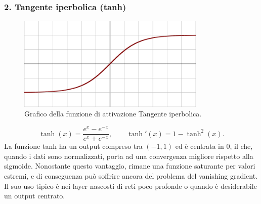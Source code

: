 \documentclass[a4paper,12pt]{report}
\begin{document}
	\subsubsection{2. Tangente iperbolica (tanh)}
	\begin{figure}[H]
		\centering
		\includegraphics[width=0.8\textwidth]{img/tanh.png}
		\caption{Grafico della funzione di attivazione Tangente iperbolica.}
	\end{figure}
	\[
	\tanh(x)=\frac{e^x-e^{-x}}{e^x+e^{-x}},\qquad
	\tanh'(x)=1-\tanh^2(x).
	\]
	La funzione tanh ha un output compreso tra $(-1,1)$ ed è centrata in $0$, il che, quando i dati sono normalizzati, porta ad una convergenza migliore rispetto alla sigmoide. Nonostante questo vantaggio, rimane una funzione saturante per valori estremi, e di conseguenza può soffrire ancora del problema del vanishing gradient. Il suo uso tipico è nei layer nascosti di reti poco profonde o quando è desiderabile un output centrato.
	
\end{document}
